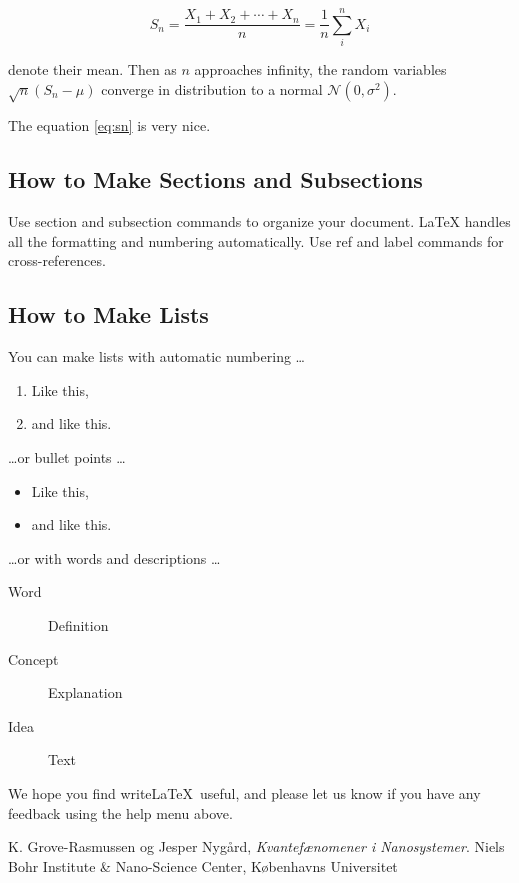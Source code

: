 \documentclass[a4paper]{article}
\begin{document}
\begin{equation}
S_n = \frac{X_1 + X_2 + \cdots + X_n}{n}
      = \frac{1}{n}\sum_{i}^{n} X_i
\label{eq:sn}
\end{equation}

denote their mean. Then as $n$ approaches infinity, the random variables $\sqrt{n}(S_n - \mu)$ converge in distribution to a normal $\mathcal{N}(0, \sigma^2)$.

The equation \ref{eq:sn} is very nice.

\subsection{How to Make Sections and Subsections}

Use section and subsection commands to organize your document. \LaTeX{} handles all the formatting and numbering automatically. Use ref and label commands for cross-references.

\subsection{How to Make Lists}

You can make lists with automatic numbering \dots

\begin{enumerate}
\item Like this,
\item and like this.
\end{enumerate}
\dots or bullet points \dots
\begin{itemize}
\item Like this,
\item and like this.
\end{itemize}
\dots or with words and descriptions \dots
\begin{description}
\item[Word] Definition
\item[Concept] Explanation
\item[Idea] Text
\end{description}

We hope you find write\LaTeX\ useful, and please let us know if you have any feedback using the help menu above.

\begin{thebibliography}{9}
  K. Grove-Rasmussen og Jesper Nygård,
  \emph{Kvantefænomener i Nanosystemer}.
  Niels Bohr Institute \& Nano-Science Center, Københavns Universitet

\end{thebibliography}
\end{document}

